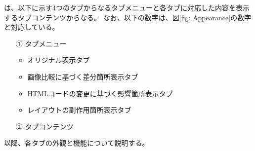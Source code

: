 \toolName は、以下に示す4つのタブからなるタブメニューと各タブに対応した内容を表示するタブコンテンツからなる。
なお、以下の数字は、図\ref{fig: Appearance}の数字と対応している。
\begin{itemize}
    \item[①] タブメニュー
          \begin{itemize}
              \item オリジナル表示タブ
              \item 画像比較に基づく差分箇所表示タブ
              \item HTMLコードの変更に基づく影響箇所表示タブ
              \item レイアウトの副作用箇所表示タブ
          \end{itemize}
    \item[②] タブコンテンツ
\end{itemize}
\par
以降、各タブの外観と機能について説明する。



